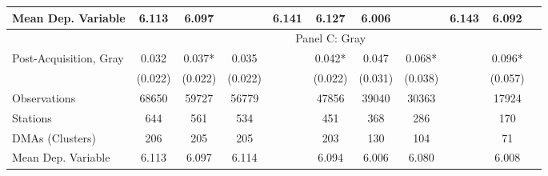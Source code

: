 {\begin{tabular}{l*{10}{c}}
Mean Dep. Variable&    6.113   &    6.097   &         &    6.141   &    6.127   &    6.006   &         &    6.143   &    6.092   \\
\midrule \ & \multicolumn{9}{c}{Panel C: Gray} \\\cmidrule(lr){2-10}
Post-Acquisition, Gray&    0.032   &    0.037*  &    0.035   &         &    0.042*  &    0.047   &    0.068*  &         &    0.096*  \\
                &  (0.022)   &  (0.022)   &  (0.022)   &         &  (0.022)   &  (0.031)   &  (0.038)   &         &  (0.057)   \\
\midrule
Observations    &    68650   &    59727   &    56779   &         &    47856   &    39040   &    30363   &         &    17924   \\
Stations        &      644   &      561   &      534   &         &      451   &      368   &      286   &         &      170   \\
DMAs (Clusters) &      206   &      205   &      205   &         &      203   &      130   &      104   &         &       71   \\
Mean Dep. Variable&    6.113   &    6.097   &    6.114   &         &    6.094   &    6.006   &    6.080   &         &    6.008   \\
\bottomrule \end{tabular}}
